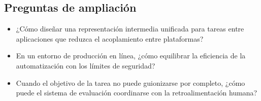 \documentclass[a4paper]{article}
\begin{document}
\subsection{Preguntas de ampliación}
\begin{itemize}
    \item ¿Cómo diseñar una representación intermedia unificada para tareas entre aplicaciones que reduzca el acoplamiento entre plataformas?
    \item En un entorno de producción en línea, ¿cómo equilibrar la eficiencia de la automatización con los límites de seguridad?
    \item Cuando el objetivo de la tarea no puede guionizarse por completo, ¿cómo puede el sistema de evaluación coordinarse con la retroalimentación humana?
\end{itemize}
\end{document}
